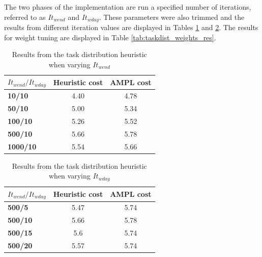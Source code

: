 The two phases of the implementation are run a specified number of iterations, referred to as $It_{wend}$ and $It_{wday}$. These parameters were also trimmed and the results from different iteration values are displayed in Tables \ref{tab:taskdist_res_wendit} and \ref{tab:taskdist_res_wdayit}. The results for weight tuning are displayed in Table \ref{tab:taskdist_weights_res}.

\begin{table}[!h]
\centering
\caption{Results from the task distribution heuristic when varying $It_{wend}$}
\label{tab:taskdist_res_wendit}
\begin{tabular}{|l|l|l|}
\hline
\rowcolor{Gray} \textbf{$It_{wend}/It_{wday}$} &  \textbf{Heuristic cost} &  \textbf{AMPL cost} \\ \hline
\cellcolor{Gray} \textbf{10/10} & \multicolumn{1}{c|}{4.40} & \multicolumn{1}{c|}{4.78} \\
\cellcolor{Gray} \textbf{50/10} & \multicolumn{1}{c|}{5.00} & \multicolumn{1}{c|}{5.34} \\
\cellcolor{Gray} \textbf{100/10} & \multicolumn{1}{c|}{5.26} & \multicolumn{1}{c|}{5.52} \\
\cellcolor{Gray} \textbf{500/10} & \multicolumn{1}{c|}{5.66} & \multicolumn{1}{c|}{5.78} \\
\cellcolor{Gray} \textbf{1000/10} & \multicolumn{1}{c|}{5.54} & \multicolumn{1}{c|}{5.66}  \\
\hline
\end{tabular}
\end{table}

\begin{table}[!h]
\centering
\caption{Results from the task distribution heuristic when varying $It_{wday}$}
\label{tab:taskdist_res_wdayit}
\begin{tabular}{|l|l|l|}
\hline
\rowcolor{Gray} \textbf{$It_{wend}/It_{wday}$} &  \textbf{Heuristic cost} &  \textbf{AMPL cost} \\ \hline
\cellcolor{Gray} \textbf{500/5} & \multicolumn{1}{c|}{5.47} & \multicolumn{1}{c|}{5.74} \\
\cellcolor{Gray} \textbf{500/10} & \multicolumn{1}{c|}{5.66} & \multicolumn{1}{c|}{5.78} \\
\cellcolor{Gray} \textbf{500/15} & \multicolumn{1}{c|}{5.6} & \multicolumn{1}{c|}{5.74} \\
\cellcolor{Gray} \textbf{500/20} & \multicolumn{1}{c|}{5.57} & \multicolumn{1}{c|}{5.74} \\
\hline
\end{tabular}
\end{table}


